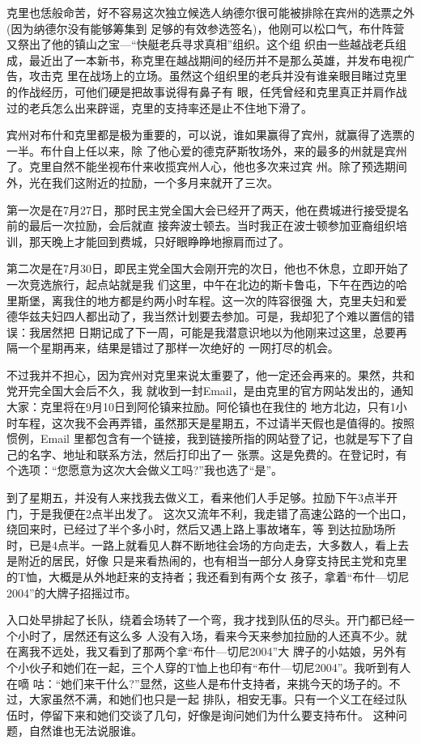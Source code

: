﻿\documentclass[11pt]{article}
\begin{document}
克里也恁般命苦，好不容易这次独立候选人纳德尔很可能被排除在宾州的选票之外(因为纳德尔没有能够筹集到
足够的有效参选签名)，他刚可以松口气，布什阵营又祭出了他的镇山之宝---``快艇老兵寻求真相''组织。这个组
织由一些越战老兵组成，最近出了一本新书，称克里在越战期间的经历并不是那么英雄，并发布电视广告，攻击克
里在战场上的立场。虽然这个组织里的老兵并没有谁亲眼目睹过克里的作战经历，可他们硬是把故事说得有鼻子有
眼，任凭曾经和克里真正并肩作战过的老兵怎么出来辟谣，克里的支持率还是止不住地下滑了。

宾州对布什和克里都是极为重要的，可以说，谁如果赢得了宾州，就赢得了选票的一半。布什自上任以来，除
了他心爱的德克萨斯牧场外，来的最多的州就是宾州了。克里自然不能坐视布什来收揽宾州人心，他也多次来过宾
州。除了预选期间外，光在我们这附近的拉励，一个多月来就开了三次。

第一次是在7月27日，那时民主党全国大会已经开了两天，他在费城进行接受提名前的最后一次拉励，会后就直
接奔波士顿去。当时我正在波士顿参加亚裔组织培训，那天晚上才能回到费城，只好眼睁睁地擦肩而过了。

第二次是在7月30日，即民主党全国大会刚开完的次日，他也不休息，立即开始了一次竞选旅行，起点站就是我
们这里，中午在北边的斯卡鲁屯，下午在西边的哈里斯堡，离我住的地方都是约两小时车程。这一次的阵容很强
大，克里夫妇和爱德华兹夫妇四人都出动了，我当然计划要去参加。可是，我却犯了个难以置信的错误：我居然把
日期记成了下一周，可能是我潜意识地以为他刚来过这里，总要再隔一个星期再来，结果是错过了那样一次绝好的
一网打尽的机会。

不过我并不担心，因为宾州对克里来说太重要了，他一定还会再来的。果然，共和党开完全国大会后不久，我
就收到一封Email，是由克里的官方网站发出的，通知大家：克里将在9月10日到阿伦镇来拉励。阿伦镇也在我住的
地方北边，只有1小时车程，这次我不会再弄错，虽然那天是星期五，不过请半天假也是值得的。按照惯例，Email
里都包含有一个链接，我到链接所指的网站登了记，也就是写下了自己的名字、地址和联系方法，然后打印出了一
张票。这是免费的。在登记时，有个选项：``您愿意为这次大会做义工吗?''我也选了``是''。

到了星期五，并没有人来找我去做义工，看来他们人手足够。拉励下午3点半开门，于是我便在2点半出发了。
这次又流年不利，我走错了高速公路的一个出口，绕回来时，已经过了半个多小时，然后又遇上路上事故堵车，等
到达拉励场所时，已是4点半。一路上就看见人群不断地往会场的方向走去，大多数人，看上去是附近的居民，好像
只是来看热闹的，也有相当一部分人身穿支持民主党和克里的T恤，大概是从外地赶来的支持者；我还看到有两个女
孩子，拿着``布什---切尼2004''的大牌子招摇过市。

入口处早排起了长队，绕着会场转了一个弯，我才找到队伍的尽头。开门都已经一个小时了，居然还有这么多
人没有入场，看来今天来参加拉励的人还真不少。就在离我不远处，我又看到了那两个拿``布什---切尼2004''大
牌子的小姑娘，另外有个小伙子和她们在一起，三个人穿的T恤上也印有``布什---切尼2004''。我听到有人在嘀
咕：``她们来干什么?''显然，这些人是布什支持者，来挑今天的场子的。不过，大家虽然不满，和她们也只是一起
排队，相安无事。只有一个义工在经过队伍时，停留下来和她们交谈了几句，好像是询问她们为什么要支持布什。
这种问题，自然谁也无法说服谁。
\end{document}
